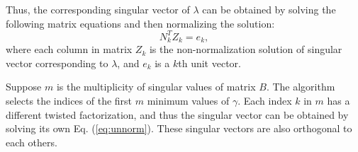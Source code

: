 Thus, the corresponding singular vector of $\lambda$ can be obtained by solving the following matrix equations and then normalizing the solution:
\begin{equation}
N_k^T Z_k = e_k,
\label{eq:unnorm}
\end{equation}
 where each column in matrix $Z_k$ is the non-normalization solution of singular vector corresponding to $\lambda$, and $e_k$ is a $k$th unit vector.

Suppose $m$ is the multiplicity of singular values of matrix $B$. 
The algorithm selects the indices of the first $m$ minimum values of $\gamma$. %
Each index $k$ in $m$ has a different twisted factorization, and thus the singular vector can be obtained by solving its own Eq. (\ref{eq:unnorm}). These singular vectors are also orthogonal to each others\cite{09NLAAtwisted}.
%

